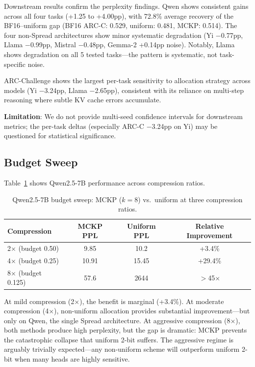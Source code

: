 \documentclass[11pt,a4paper]{article}
\begin{document}
Downstream results confirm the perplexity findings.
Qwen shows consistent gains across all four tasks (+1.25 to +4.00pp), with 72.8\% average recovery of the BF16--uniform gap (BF16 ARC-C: 0.529, uniform: 0.481, MCKP: 0.514).
The four non-Spread architectures show minor systematic degradation (Yi $-$0.77pp, Llama $-$0.99pp, Mistral $-$0.48pp, Gemma-2 +0.14pp noise).
Notably, Llama shows degradation on all 5 tested tasks---the pattern is systematic, not task-specific noise.

ARC-Challenge shows the largest per-task sensitivity to allocation strategy across models (Yi $-$3.24pp, Llama $-$2.65pp), consistent with its reliance on multi-step reasoning where subtle KV cache errors accumulate.

\textbf{Limitation}: We do not provide multi-seed confidence intervals for downstream metrics; the per-task deltas (especially ARC-C $-$3.24pp on Yi) may be questioned for statistical significance.

\subsection{Budget Sweep}\label{sec:budget}

Table~\ref{tab:budget} shows Qwen2.5-7B performance across compression ratios.

\begin{table}[h]
\centering
\caption{Qwen2.5-7B budget sweep: MCKP ($k\!=\!8$) vs.\ uniform at three compression ratios.}
\label{tab:budget}
\small
\begin{tabular}{lccc}
\toprule
Compression & MCKP PPL & Uniform PPL & Relative Improvement \\
\midrule
2$\times$ (budget 0.50) & 9.85 & 10.2 & +3.4\% \\
4$\times$ (budget 0.25) & 10.91 & 15.45 & +29.4\% \\
8$\times$ (budget 0.125) & 57.6 & 2644 & $>$45$\times$ \\
\bottomrule
\end{tabular}
\end{table}

At mild compression (2$\times$), the benefit is marginal (+3.4\%).
At moderate compression (4$\times$), non-uniform allocation provides substantial improvement---but only on Qwen, the single Spread architecture.
At aggressive compression (8$\times$), both methods produce high perplexity, but the gap is dramatic: MCKP prevents the catastrophic collapse that uniform 2-bit suffers.
The aggressive regime is arguably trivially expected---any non-uniform scheme will outperform uniform 2-bit when many heads are highly sensitive.
\end{document}
